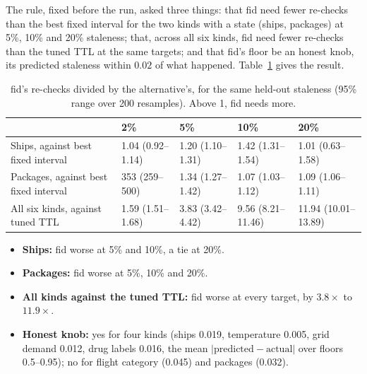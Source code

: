 The rule, fixed before the run, asked three things: that fid need fewer
re-checks than the best fixed interval for the two kinds with a state
(ships, packages) at 5\%, 10\% and 20\% staleness; that, across all six
kinds, fid need fewer re-checks than the tuned TTL at the same targets; and
that fid's floor be an honest knob, its predicted staleness within $0.02$
of what happened. Table~\ref{tab:rule} gives the result.

\begin{table}[t]
\centering
\small
\caption{fid's re-checks divided by the alternative's, for the same held-out
staleness (95\% range over 200 resamples). Above 1, fid needs more.}
\label{tab:rule}
\begin{tabular}{lllll}
\toprule
 & 2\% & 5\% & 10\% & 20\% \\
\midrule
Ships, against best fixed interval & 1.04 (0.92--1.14) & 1.20 (1.10--1.31) & 1.42 (1.31--1.54) & 1.01 (0.63--1.58) \\
Packages, against best fixed interval & 353 (259--500) & 1.34 (1.27--1.42) & 1.07 (1.03--1.12) & 1.09 (1.06--1.11) \\
All six kinds, against tuned TTL & 1.59 (1.51--1.68) & 3.83 (3.42--4.42) & 9.56 (8.21--11.46) & 11.94 (10.01--13.89) \\
\bottomrule
\end{tabular}
\end{table}

\begin{itemize}
  \item \textbf{Ships:} fid worse at 5\% and 10\%, a tie at 20\%.
  \item \textbf{Packages:} fid worse at 5\%, 10\% and 20\%.
  \item \textbf{All kinds against the tuned TTL:} fid worse at every target,
    by $3.8\times$ to $11.9\times$.
  \item \textbf{Honest knob:} yes for four kinds (ships 0.019, temperature
    0.005, grid demand 0.012, drug labels 0.016, the mean
    $|\text{predicted} - \text{actual}|$ over floors 0.5--0.95); no for
    flight category (0.045) and packages (0.032).
\end{itemize}

